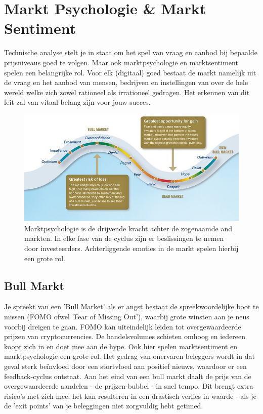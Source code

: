 \medskip

\section{Markt Psychologie \& Markt Sentiment}
Technische analyse stelt je in staat om het spel van vraag en aanbod bij bepaalde prijsniveaus goed te volgen. Maar ook marktpsychologie en marktsentiment spelen een belangrijke rol. Voor elk (digitaal) goed bestaat de markt namelijk uit de vraag en het aanbod van mensen, bedrijven en instellingen van over de hele wereld welke zich zowel rationeel als irrationeel gedragen. Het erkennen van dit feit zal van vitaal belang zijn voor jouw succes.

    \medskip
    \begin{figure}
        \centering
        \includegraphics[width=.95\textwidth]{img/ch-investing/bear_bullmarket.jpg}
        \caption[Bear and Bull Markets and Market Psychology]{Marktpsychologie is de drijvende kracht achter de zogenaamde  and  markten. In elke fase van de cyclus zijn er beslissingen te nemen door investeerders. Achterliggende emoties in de markt spelen hierbij een grote rol.}
        \label{fig:bear_bullmarket}
    \end{figure}
    \medskip

\subsection{Bull Markt}
Je spreekt van een 'Bull Market' als er angst bestaat de spreekwoordelijke boot te missen (FOMO ofwel 'Fear of Missing Out'), waarbij grote winsten aan je neus voorbij dreigen te gaan. FOMO kan uiteindelijk leiden tot overgewaardeerde prijzen van cryptocurrencies. De handelsvolumes schieten omhoog en iedereen koopt zich in en doet mee aan de hype. Ook hier spelen marktsentiment en marktpsychologie een grote rol. Het gedrag van onervaren beleggers wordt in dat geval sterk be{\"i}nvloed door een stortvloed aan positief nieuws, waardoor er een feedback-cyclus ontstaat. Aan het eind van een bull markt daalt de prijs van de overgewaardeerde aandelen - de prijzen-bubbel - in snel tempo. Dit brengt extra risico's met zich mee: het kan resulteren in een drastisch verlies in waarde - als je de 'exit points' van je beleggingen niet zorgvuldig hebt getimed.\medskip

